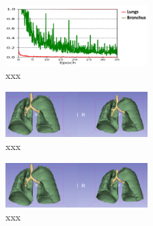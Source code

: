 \begin{figure}[h!]
	\includegraphics[width=0.49\textwidth, angle=0]{files/deepmedictrain.png}
	\caption{xxx}
	\label{scan_picture}
\end{figure}

\begin{figure}[h!]
	\includegraphics[width=0.49\textwidth, angle=0]{files/preddeepmedic.png}
	\caption{xxx}
	\label{scan_picture}
\end{figure}

\begin{figure}[h!]
	\includegraphics[width=0.49\textwidth, angle=0]{files/predunet.png}
	\caption{xxx}
	\label{scan_picture}
\end{figure}
